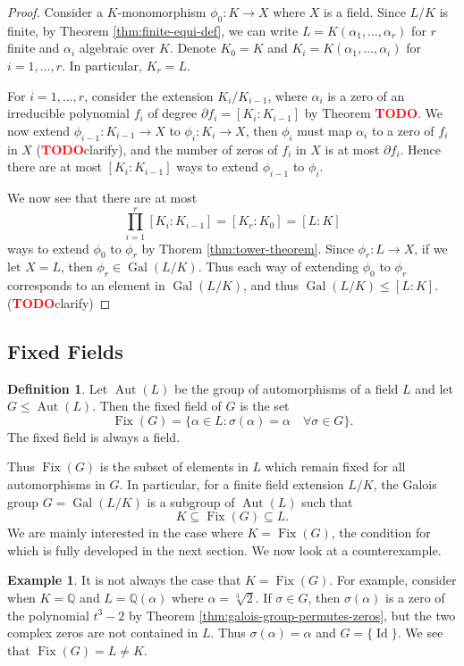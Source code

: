 \documentclass[12pt]{article}
\theoremstyle{definition}
\newtheorem{definition}[theorem]{Definition}
\newtheorem{example}[theorem]{Example}
\newcommand{\Gal}{\operatorname{Gal}}
\newcommand{\Aut}{\operatorname{Aut}}
\newcommand{\Fix}{\operatorname{Fix}}
\newcommand{\Id}{\operatorname{Id}}
\newcommand{\Q}{\mathbb Q}
\newcommand{\TODO}{\textbf{\textcolor{red}{TODO}}}
\begin{document}
\begin{proof}
    Consider a $K$-monomorphism $\phi_0 : K \to X$ where $X$ is a field. Since $L/K$ is finite, by Theorem \ref{thm:finite-equi-def}, we can write $L = K(\alpha_1, \ldots, \alpha_r)$ for $r$ finite and $\alpha_i$ algebraic over $K$. Denote $K_0 = K$ and
    $K_i = K(\alpha_1, \dots, \alpha_i)$ for $i = 1, \ldots, r$. In particular, $K_r = L$. 


    For $i = 1, \ldots, r$, consider the extension $K_i / K_{i-1}$, 
    where $\alpha_i$ is a zero of an irreducible polynomial $f_i$ of degree $\partial f_i = [K_i : K_{i-1}]$ by Theorem \TODO. We now extend $\phi_{i-1} : K_{i-1} \to X$ to $\phi_i: K_i \to X$, then $\phi_i$ must map $\alpha_i$ to a zero of $f_i$ in $X$ (\TODO clarify), and the number of zeros of $f_i$ in $X$ is at most $\partial f_i$. Hence there are at most $[K_i : K_{i-1}]$ ways to extend $\phi_{i-1}$ to $\phi_i$.

    We now see that there are at most $$\prod_{i=1} ^r [K_i : K_{i-1}] = [K_r : K_0] = [L : K]$$ ways to extend $\phi_0$ to $\phi_r$ by Thorem \ref{thm:tower-theorem}. Since $\phi_r : L \to X$, if we let $X = L$, then $\phi_r \in \Gal(L/K)$. Thus each way of extending $\phi_0$ to $\phi_r$ corresponds to an element in $\Gal(L/K)$, and thus $\Gal(L/K) \le [L:K]$. (\TODO clarify)
\end{proof}
\cite{galois-theory-lectures}


\subsection{Fixed Fields}

\begin{definition}
    Let $\Aut(L)$ be the group of automorphisms of a field $L$ and let $G \leq \Aut(L)$. Then the fixed field of $G$ is the set $$\Fix(G) = \{ \alpha \in L : \sigma(\alpha) = \alpha \quad \forall \sigma \in G \}. $$ The fixed field is always a field.
\end{definition}
Thus $\Fix(G)$ is the subset of elements in $L$ which remain fixed for all automorphisms in $G$. In particular, for a finite field extension $L/ K$, the Galois group $G = \Gal(L / K)$ is a subgroup of $\Aut(L)$ such that $$K \subseteq \Fix(G) \subseteq L. $$ We are mainly interested in the case where $K = \Fix(G)$, the condition for which is fully developed in the next section. We now look at a counterexample. 

\begin{example}
    It is not always the case that $K = \Fix(G)$. For example, consider when $K = \Q$ and $L = \Q (\alpha)$ where $\alpha = \sqrt[3]{2}$. If $\sigma \in G$, then $\sigma(\alpha)$ is a zero of the polynomial $t^3 - 2$ by Theorem \ref{thm:galois-group-permutes-zeros}, but the two complex zeros are not contained in $L$. Thus $\sigma(\alpha) = \alpha$ and $G = \{ \Id \}$. We see that $\Fix(G) = L \neq K$. 
\end{example}
\end{document}
